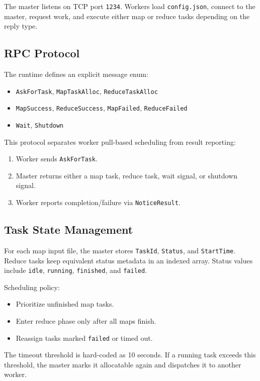 \documentclass[12pt]{article}
\begin{document}
The master listens on TCP port \texttt{1234}. Workers load \texttt{config.json}, connect to the master, request work, and execute either map or reduce tasks depending on the reply type.

\subsection{RPC Protocol}
The runtime defines an explicit message enum:
\begin{itemize}[leftmargin=1.5em]
  \item \texttt{AskForTask}, \texttt{MapTaskAlloc}, \texttt{ReduceTaskAlloc}
  \item \texttt{MapSuccess}, \texttt{ReduceSuccess}, \texttt{MapFailed}, \texttt{ReduceFailed}
  \item \texttt{Wait}, \texttt{Shutdown}
\end{itemize}

This protocol separates worker pull-based scheduling from result reporting:
\begin{enumerate}[leftmargin=1.5em]
  \item Worker sends \texttt{AskForTask}.
  \item Master returns either a map task, reduce task, wait signal, or shutdown signal.
  \item Worker reports completion/failure via \texttt{NoticeResult}.
\end{enumerate}

\subsection{Task State Management}
For each map input file, the master stores \texttt{TaskId}, \texttt{Status}, and \texttt{StartTime}. Reduce tasks keep equivalent status metadata in an indexed array. Status values include \texttt{idle}, \texttt{running}, \texttt{finished}, and \texttt{failed}.

Scheduling policy:
\begin{itemize}[leftmargin=1.5em]
  \item Prioritize unfinished map tasks.
  \item Enter reduce phase only after all maps finish.
  \item Reassign tasks marked \texttt{failed} or timed out.
\end{itemize}

The timeout threshold is hard-coded as 10 seconds. If a running task exceeds this threshold, the master marks it allocatable again and dispatches it to another worker.
\end{document}
